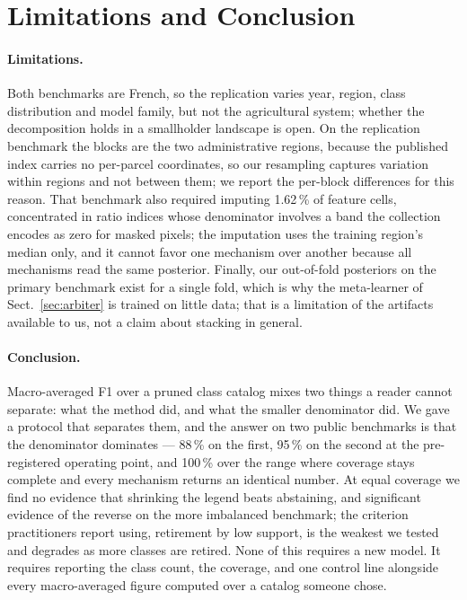 \section{Limitations and Conclusion}
\label{sec:conclusion}

\paragraph{Limitations.}
Both benchmarks are French, so the replication varies year, region, class distribution and model
family, but not the agricultural system; whether the decomposition holds in a smallholder landscape
is open. On the replication benchmark the blocks are the two administrative regions, because the
published index carries no per-parcel coordinates, so our resampling captures variation within
regions and not between them; we report the per-block differences for this reason. That benchmark
also required imputing \num{1.62}\,\% of feature cells, concentrated in ratio indices whose
denominator involves a band the collection encodes as zero for masked pixels; the imputation uses
the training region's median only, and it cannot favor one mechanism over another because all
mechanisms read the same posterior. Finally, our out-of-fold posteriors on the primary benchmark
exist for a single fold, which is why the meta-learner of Sect.~\ref{sec:arbiter} is trained on
little data; that is a limitation of the artifacts available to us, not a claim about stacking in
general.

\paragraph{Conclusion.}
Macro-averaged F1 over a pruned class catalog mixes two things a reader cannot separate: what the
method did, and what the smaller denominator did. We gave a protocol that separates them, and the
answer on two public benchmarks is that the denominator dominates --- \num{88}\,\% on the first,
\num{95}\,\% on the second at the pre-registered operating point, and \num{100}\,\% over the range
where coverage stays complete and every mechanism returns an identical number. At equal coverage
we find no evidence that shrinking the legend beats abstaining, and significant evidence of the
reverse on the more imbalanced benchmark; the criterion practitioners report using, retirement by
low support, is the weakest we tested and degrades as more classes are retired. None of this
requires a new model. It requires reporting the class count, the coverage, and one control line
alongside every macro-averaged figure computed over a catalog someone chose.
